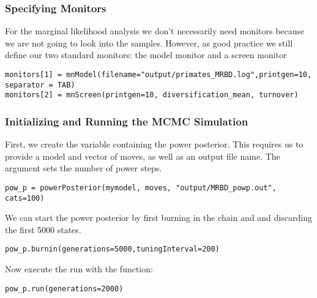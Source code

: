 \subsubsection{Specifying Monitors}

For the marginal likelihood analysis we don't necessarily need monitors because we are not going to look into the samples.
However, as good practice we still define our two standard monitors: the model monitor and a screen monitor
{\tt \begin{snugshade*}
\begin{lstlisting}
monitors[1] = mnModel(filename="output/primates_MRBD.log",printgen=10, separator = TAB)
monitors[2] = mnScreen(printgen=10, diversification_mean, turnover)
\end{lstlisting}
\end{snugshade*}}

\subsubsection{Initializing and Running the MCMC Simulation}



First, we create the variable containing the power posterior. 
This requires us to provide a model and vector of moves, as well as an output file name. 
The  argument sets the number of power steps.
{\tt \begin{snugshade*}
\begin{lstlisting}
pow_p = powerPosterior(mymodel, moves, "output/MRBD_powp.out", cats=100) 
\end{lstlisting}
\end{snugshade*}}

We can start the power posterior by first burning in the chain and and discarding the first 5000 states.  
{\tt \begin{snugshade*}
\begin{lstlisting}
pow_p.burnin(generations=5000,tuningInterval=200)
\end{lstlisting}
\end{snugshade*}}

Now execute the run with the  function:
{\tt \begin{snugshade*}
\begin{lstlisting}
pow_p.run(generations=2000)  
\end{lstlisting}
\end{snugshade*}}


